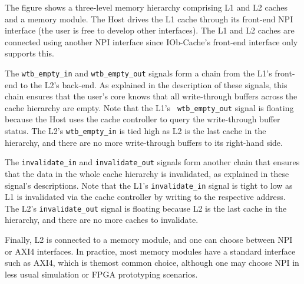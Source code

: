 The figure shows a three-level memory hierarchy comprising L1 and L2 caches and
a memory module. The Host drives the L1 cache through its front-end NPI
interface (the user is free to develop other interfaces).  The L1 and L2 caches
are connected using another NPI interface since IOb-Cache's front-end interface
only supports this.

The {\tt wtb\_empty\_in} and {\tt wtb\_empty\_out} signals form a chain from the
L1's front-end to the L2's back-end. As explained in the description of these
signals, this chain ensures that the user's core knows that all write-through
buffers across the cache hierarchy are empty. Note that the L1's {\tt
  wtb\_empty\_out} signal is floating because the Host uses the cache controller
to query the write-through buffer status. The L2's {\tt wtb\_empty\_in} is tied
high as L2 is the last cache in the hierarchy, and there are no more
write-through buffers to its right-hand side.

The {\tt invalidate\_in} and {\tt invalidate\_out} signals form another chain that
ensures that the data in the whole cache hierarchy is invalidated, as explained
in these signal's descriptions. Note that the L1's {\tt invalidate\_in} signal is
tight to low as L1 is invalidated via the cache controller by writing to the
respective address. The L2's {\tt invalidate\_out} signal is floating because L2
is the last cache in the hierarchy, and there are no more caches to invalidate.

Finally, L2 is connected to a memory module, and one can choose between NPI or
AXI4 interfaces. In practice, most memory modules have a standard interface such
as AXI4, which is themost common choice, although one may choose NPI in less
usual simulation or FPGA prototyping scenarios.

